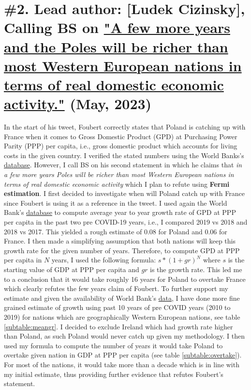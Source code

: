 \documentclass[fleqn,12pt]{article}
\begin{document}
\section{\#2. Lead author: [Ludek Cizinsky], Calling BS on \href{https://twitter.com/d_foubert/status/1660076858451402752?s=20}{"A few more years and the Poles will 
be richer than most Western European nations in terms of real domestic economic activity."} (May, 2023)}
In the start of his tweet, Foubert correctly states that Poland is catching up with France when it comes to Gross Domestic Product (GPD) at Purchasing Power Parity (PPP) per capita, i.e., gross domestic product 
which accounts for living costs in the given country. I verified the stated numbers using the World Banks's \href{https://data.worldbank.org/indicator/NY.GDP.PCAP.PP.CD?locations=FR-PL}{database}. 
However, I call BS on his second statement in which he claims that \textit{in a few more years Poles will be richer than most Western European nations in terms of real domestic economic activity} 
which I plan to refute using \textbf{Fermi estimation}. I first decided to investigate when will Poland catch up with France since Foubert is using it as a reference in the tweet. 
I used again the World Bank's \href{https://data.worldbank.org/indicator/NY.GDP.PCAP.PP.CD?locations=FR-PL}{database} to compute average year to year growth rate of GPD at PPP per capita in the past two 
pre COVID-19 years, i.e., I compared 2019 vs 2018 and 2018 vs 2017. This yielded a rough estimate of $0.08$ for Poland and $0.06$ for France. I then made a simplifying assumption that 
both nations will keep this growth rate for the given number of years.  Therefore, to compute GPD at PPP per capita in $N$ years, I used the following formula:
$s*(1 + gr)^N$ where $s$ is the starting value of GDP at PPP per capita and $gr$ is the growth rate. This led me to a conclusion that it would take roughly 16 years for Poland to 
overtake France which clearly refutes the few years claim of Foubert. To further support my estimate and given the availability of World Bank's
\href{https://data.worldbank.org/indicator/NY.GDP.PCAP.PP.CD?locations=FR-PL}{data}, I have done more fine grained estimate of growth using past 10 years of pre COVID years (2010 to 2019) for 
nations which are geographically Western European nations, see table \ref{subtable:meangr}. I decided to exclude Ireland which had growth rate higher than Poland, as such Poland would 
never catch up given my methodology. I then used my formula to compute the number of years it would take Poland to overtake given nation in GDP at PPP per capita (see table \ref{subtable:overtake}). 
For most of the nations, it would take more than a decade which is in line with my initial estimate, thus providing further evidence that refutes Foubert's statement.
\end{document}
